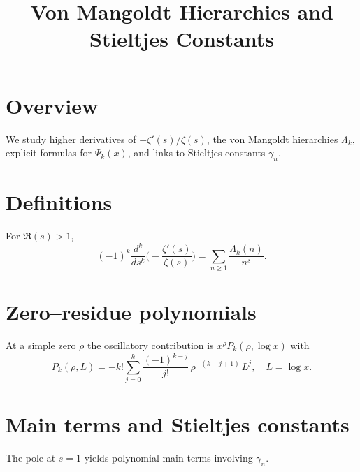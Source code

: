 \documentclass[11pt]{article}
\title{Von Mangoldt Hierarchies and Stieltjes Constants}
\author{}
\date{}
\begin{document}
\maketitle

\section{Overview}
We study higher derivatives of $-\zeta'(s)/\zeta(s)$, the von Mangoldt hierarchies $\Lambda_k$, explicit formulas for $\Psi_k(x)$, and links to Stieltjes constants $\gamma_n$.

\section{Definitions}
For $\Re(s)>1$,
\[
(-1)^k\frac{d^k}{ds^k}\Big(-\frac{\zeta'(s)}{\zeta(s)}\Big)=\sum_{n\ge1}\frac{\Lambda_k(n)}{n^s}.
\]

\section{Zero--residue polynomials}
At a simple zero $\rho$ the oscillatory contribution is $x^\rho P_k(\rho,\log x)$ with
\[
P_k(\rho,L)=-k!\sum_{j=0}^{k}\frac{(-1)^{k-j}}{j!}\,\rho^{-(k-j+1)}\,L^j,
\quad L=\log x.
\]

\section{Main terms and Stieltjes constants}
The pole at $s=1$ yields polynomial main terms involving $\gamma_n$.
\end{document}
